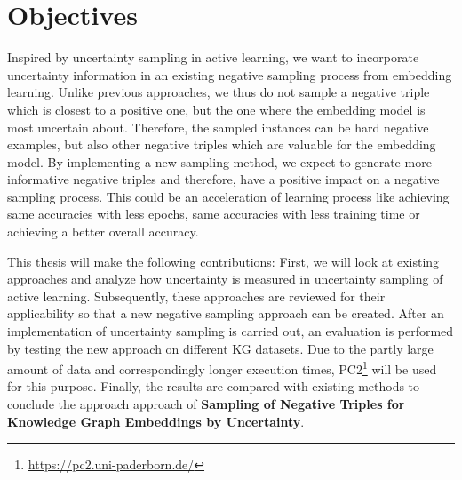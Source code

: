 \section{Objectives}
\label{sec:objectives}

Inspired by uncertainty sampling in active learning, we want to incorporate uncertainty information in an existing negative sampling process from embedding learning.
Unlike previous approaches, we thus do not sample a negative triple which is closest to a positive one, but the one where the embedding model is most uncertain about.
Therefore, the sampled instances can be hard negative examples, but also other negative triples which are valuable for the embedding model.
By implementing a new sampling method, we expect to generate more informative negative triples and therefore, have a positive impact on a negative sampling process.
This could be an acceleration of learning process like achieving same accuracies with less epochs, same accuracies with less training time or achieving a better overall accuracy.

This thesis will make the following contributions:
First, we will look at existing approaches and analyze how uncertainty is measured in uncertainty sampling of active learning.
Subsequently, these approaches are reviewed for their applicability so that a new negative sampling approach can be created.
After an implementation of uncertainty sampling is carried out, 
an evaluation is performed by testing the new approach on different \ac{KG} datasets.
Due to the partly large amount of data and correspondingly longer execution times, \ac{PC2}\footnote{\url{https://pc2.uni-paderborn.de/}} will be used for this purpose.
Finally, the results are compared with existing methods to conclude the approach approach of \textbf{Sampling of Negative Triples for Knowledge Graph Embeddings by Uncertainty}.








